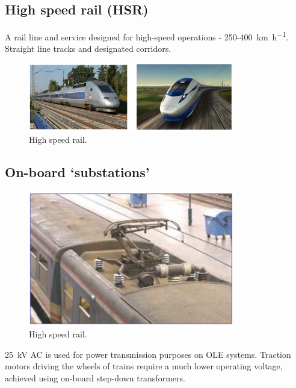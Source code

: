 \subsection{High speed rail (HSR)}
A rail line and service designed for high-speed operations - 250-\SI{400}{\kilo\meter\per\hour}. Straight line tracks and designated corridors.
\begin{figure}[H]
    \centering
    \includegraphics[width = 0.8\textwidth]{img/figure132.png}
    \caption{High speed rail.}
\end{figure}
\subsection{On-board `substations'}
\begin{figure}[H]
    \centering
    \includegraphics[width = 0.8\textwidth]{img/figure133.png}
    \caption{High speed rail.}
\end{figure}
\SI{25}{\kilo\volt} AC is used for power transmission purposes on OLE systems. Traction motors driving the wheels of trains require a much lower operating voltage, achieved using on-board step-down transformers. 
